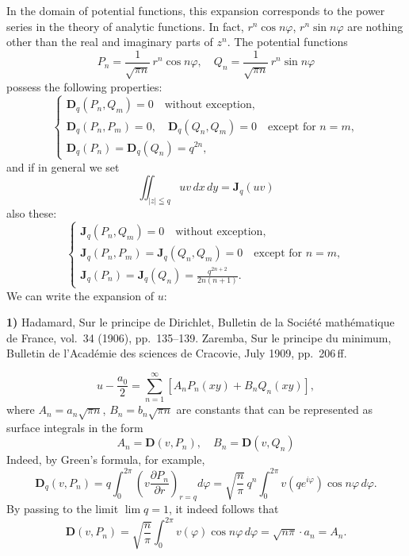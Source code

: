 \documentclass{article}
\begin{document}
In the domain of potential functions, this expansion corresponds to the power series in the theory of analytic functions. In fact, $r^n \cos n\varphi$, $r^n \sin n\varphi$ are nothing other than the real and imaginary parts of $z^n$. The potential functions
\[ P_n = \frac{1}{\sqrt{\pi n}}\,r^n \cos n\varphi, \quad Q_n = \frac{1}{\sqrt{\pi n}}\,r^n \sin n\varphi \]
possess the following properties:
\[ \left\{
\begin{gathered}
\mathbf{D}_q(P_n, Q_m) = 0 \quad \text{without exception}, \\
\mathbf{D}_q(P_n, P_m) = 0, \quad \mathbf{D}_q(Q_n, Q_m) = 0 \quad \text{except for } n = m, \\
\mathbf{D}_q(P_n) = \mathbf{D}_q(Q_n) = q^{2n},
\end{gathered}
\right. \tag{I} \]
and if in general we set
\[ \iint_{|z| \leqq q} u v\,dx\,dy = \mathbf{J}_q(uv) \]
also these:
\[ \left\{
\begin{gathered}
\mathbf{J}_q(P_n, Q_m) = 0 \quad \text{without exception}, \\
\mathbf{J}_q(P_n, P_m) = \mathbf{J}_q(Q_n, Q_m) = 0 \quad \text{except for } n = m, \\
\mathbf{J}_q(P_n) = \mathbf{J}_q(Q_n) = \frac{q^{2n+2}}{2n(n+1)}.
\end{gathered}
\right. \tag{II} \]
We can write the expansion of $u$:

\textbf{1)} Hadamard, Sur le principe de Dirichlet, Bulletin de la Société mathématique de France, vol.~34 (1906), pp.~135--139. Zaremba, Sur le principe du minimum, Bulletin de l'Académie des sciences de Cracovie, July 1909, pp.~206\,ff.

\[ u - \frac{a_0}{2} = \sum_{n=1}^\infty [A_n P_n(xy) + B_n Q_n(xy)], \tag{17} \]
where $A_n = a_n \sqrt{\pi n}$, $B_n = b_n \sqrt{\pi n}$ are constants that can be represented as surface integrals in the form
\[ A_n = \mathbf{D}(v, P_n), \quad B_n = \mathbf{D}(v, Q_n) \tag{18} \]
Indeed, by Green's formula, for example,
\[ \mathbf{D}_q(v, P_n) = q \int_0^{2\pi} \left( v \frac{\partial P_n}{\partial r} \right)_{r=q} d\varphi = \sqrt{\frac{n}{\pi}}\,q^n \int_0^{2\pi} v(q e^{i\varphi}) \cos n\varphi\,d\varphi. \]
By passing to the limit $\lim q = 1$, it indeed follows that
\[ \mathbf{D}(v, P_n) = \sqrt{\frac{n}{\pi}} \int_0^{2\pi} v(\varphi) \cos n\varphi\,d\varphi = \sqrt{n\pi} \cdot a_n = A_n. \]
\end{document}
